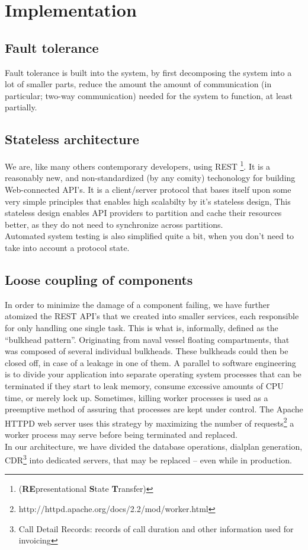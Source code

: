 \section{Implementation}
\subsection{Fault tolerance}
Fault tolerance is built into the system, by first decomposing the system into a lot of smaller parts, reduce the amount the amount of communication (in particular; two-way communication) needed for the system to function, at least partially.

\subsection{Stateless architecture}
\label{sec:rest}
We are, like many others contemporary developers, using REST \footnote{(\textbf{RE}presentational \textbf{S}tate \textbf{T}ransfer)}. It is a reasonably new, and non-standardized (by any comity) techonology for building Web-connected API's. It is a client/server protocol that bases itself upon some very simple principles that enables high scalabilty by it's stateless design, This stateless design enables API providers to partition and cache their resources better, as they do not need to synchronize across partitions.\\
Automated system testing is also simplified quite a bit, when you don't need to take into account a protocol state.

\subsection{Loose coupling of components} 
In order to minimize the damage of a component failing, we have further atomized the REST API's that we created into smaller services, each responsible for only handling one single task. This is what is, informally, defined as the ``bulkhead pattern''. Originating from naval vessel floating compartments, that was composed of several individual bulkheads. These bulkheads could then be closed off, in case of a leakage in one of them. A parallel to software engineering is to divide your application into separate operating system processes that can be terminated if they start to leak memory, consume excessive amounts of CPU time, or merely lock up. Sometimes, killing worker processes is used as a preemptive method of assuring that processes are kept under control. The Apache HTTPD web server uses this strategy by maximizing the number of requests\footnote{http://httpd.apache.org/docs/2.2/mod/worker.html} a worker process may serve before being terminated and replaced.\\
In our architecture, we have divided the database operations, dialplan generation, CDR\footnote{Call Detail Records: records of call duration and other information used for invoicing} into dedicated servers, that may be replaced -- even while in production.

